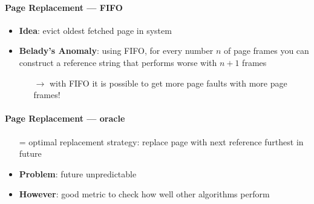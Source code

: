 \paragraph{Page Replacement --- FIFO}
\begin{itemize}
  \item \textbf{Idea}: evict oldest fetched page in system
  \item \textbf{Belady's Anomaly}: using FIFO, for every number $ n $ of page frames you can construct a reference string that performs worse with $ n+1 $ frames
  \begin{itemize}
    \item[$ \to $] with FIFO it is possible to get more page faults with more page frames!
  \end{itemize}
\end{itemize}

\paragraph{Page Replacement --- oracle}
\begin{itemize}
  \item[=] optimal replacement strategy: replace page with next reference furthest in future
  \item \textbf{Problem}: future unpredictable
  \item \textbf{However}: good metric to check how well other algorithms perform
\end{itemize}

